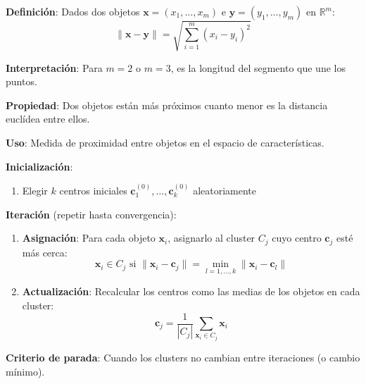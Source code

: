 \documentclass[10pt,a4paper]{article}
\begin{document}
\begin{tcolorbox}[title=Distancia Euclídea]
    \textbf{Definición}: Dados dos objetos $\mathbf{x} = (x_1, \ldots, x_m)$ e $\mathbf{y} = (y_1, \ldots, y_m)$ en $\mathbb{R}^m$:
    \[
        \|\mathbf{x} - \mathbf{y}\| = \sqrt{\sum_{i=1}^m (x_i - y_i)^2}
    \]
    
    \textbf{Interpretación}: Para $m = 2$ o $m = 3$, es la longitud del segmento que une los puntos.
    
    \textbf{Propiedad}: Dos objetos están más próximos cuanto menor es la distancia euclídea entre ellos.
    
    \textbf{Uso}: Medida de proximidad entre objetos en el espacio de características.
\end{tcolorbox}

\begin{tcolorbox}[title=Algoritmo k-medias: Pasos]
    \textbf{Inicialización}:
    \begin{enumerate}
        \item Elegir $k$ centros iniciales $\mathbf{c}_1^{(0)}, \ldots, \mathbf{c}_k^{(0)}$ aleatoriamente
    \end{enumerate}
    
    \textbf{Iteración} (repetir hasta convergencia):
    \begin{enumerate}
        \item \textbf{Asignación}: Para cada objeto $\mathbf{x}_i$, asignarlo al cluster $C_j$ cuyo centro $\mathbf{c}_j$ esté más cerca:
        \[
            \mathbf{x}_i \in C_j \text{ si } \|\mathbf{x}_i - \mathbf{c}_j\| = \min_{l=1,\ldots,k} \|\mathbf{x}_i - \mathbf{c}_l\|
        \]
        
        \item \textbf{Actualización}: Recalcular los centros como las medias de los objetos en cada cluster:
        \[
            \mathbf{c}_j = \frac{1}{|C_j|} \sum_{\mathbf{x}_i \in C_j} \mathbf{x}_i
        \]
    \end{enumerate}
    
    \textbf{Criterio de parada}: Cuando los clusters no cambian entre iteraciones (o cambio mínimo).
\end{tcolorbox}
\end{document}

